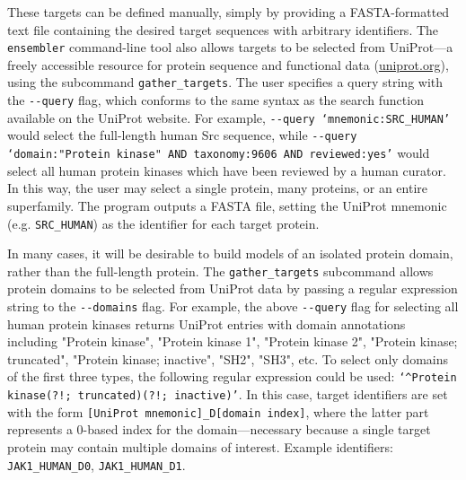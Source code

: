 \documentclass[aps,pre,twocolumn,nofootinbib,superscriptaddress,linenumbers]{revtex4-1}
\begin{document}
These targets can be defined manually, simply by providing a FASTA-formatted text file containing the desired target sequences with arbitrary identifiers.
The {\tt ensembler} command-line tool also allows targets to be selected from UniProt---a freely accessible resource for protein sequence and functional data (\href{http://www.uniprot.org/}{uniprot.org}), using the subcommand {\tt gather\_targets}.
The user specifies a query string with the {\tt -{}-query} flag, which conforms to the same syntax as the search function available on the UniProt website.
For example, {\tt -{}-query `mnemonic:SRC\_HUMAN'} would select the full-length human Src sequence, while {\tt -{}-query `domain:"Protein kinase" AND taxonomy:9606 AND reviewed:yes'} would select all human protein kinases which have been reviewed by a human curator.
In this way, the user may select a single protein, many proteins, or an entire superfamily.
The program outputs a FASTA file, setting the UniProt mnemonic (e.g. {\tt SRC\_HUMAN}) as the identifier for each target protein.

In many cases, it will be desirable to build models of an isolated protein domain, rather than the full-length protein.
The {\tt gather\_targets} subcommand allows protein domains to be selected from UniProt data by passing a regular expression string to the {\tt -{}-domains} flag. 
For example, the above {\tt -{}-query} flag for selecting all human protein kinases returns UniProt entries with domain annotations including "Protein kinase", "Protein kinase 1", "Protein kinase 2", "Protein kinase; truncated", "Protein kinase; inactive", "SH2", "SH3", etc.
To select only domains of the first three types, the following regular expression could be used: {\tt`\^{}Protein kinase(?!; truncated)(?!; inactive)'}.
In this case, target identifiers are set with the form {\tt [UniProt mnemonic]\_D[domain index]}, where the latter part represents a 0-based index for the domain---necessary because a single target protein may contain multiple domains of interest.
Example identifiers: {\tt JAK1\_HUMAN\_D0}, {\tt JAK1\_HUMAN\_D1}.
\end{document}
